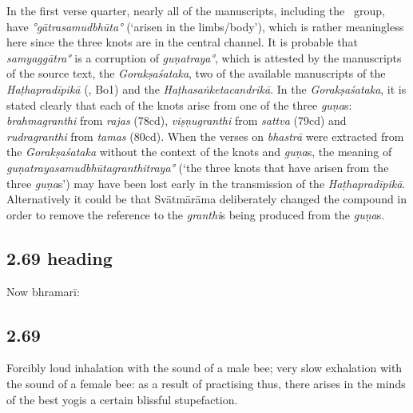 \begin{ekdosis}
\begin{philcomm}[hp02_068]
In the first verse quarter, nearly all of the manuscripts, including the \textalpha\ group, have \emph{°gātrasamudbhūta°} (`arisen in the limbs/body'), which is rather meaningless here since the three knots are in the central channel. It is probable that \emph{samyaggātra°} is a corruption of \emph{guṇatraya°}, which is attested by the manuscripts of the source text, the \emph{Gorakṣaśataka}, two of the available manuscripts of the \emph{Haṭhapradīpikā} (, Bo1) and the \emph{Haṭhasaṅketacandrikā}. In the \emph{Gorakṣaśataka}, it is stated clearly that each of the knots arise from one of the three \emph{guṇa}s: \emph{brahmagranthi} from \emph{rajas} (78cd), \emph{viṣṇugranthi} from \emph{sattva} (79cd) and \emph{rudragranthi} from \emph{tamas} (80cd). When the verses on \emph{bhastrā} were extracted from the \emph{Gorakṣaśataka} without the context of the knots and \emph{guṇa}s, the meaning of \emph{guṇa\-traya\-sam\-udbhūta\-granthi\-traya°} (`the three knots that have arisen from the three \emph{guṇa}s') may have been lost early in the transmission of the \emph{Haṭhapradīpikā}. Alternatively it could be that Svātmārāma deliberately changed the compound in order to remove the reference to the \emph{granthi}s being produced from the \emph{guṇa}s.
\end{philcomm}


\subsection*{2.69 heading}
\begin{translation}[hp02_069a]
Now bhramarī:
\end{translation}


\subsection*{2.69}
\begin{translation}[hp02_069]
Forcibly loud inhalation with the sound of a male bee; very slow exhalation with the sound of a female bee: as a result of practising thus, there arises in the minds of the best yogis a certain blissful stupefaction.
\end{translation}


\end{ekdosis}

